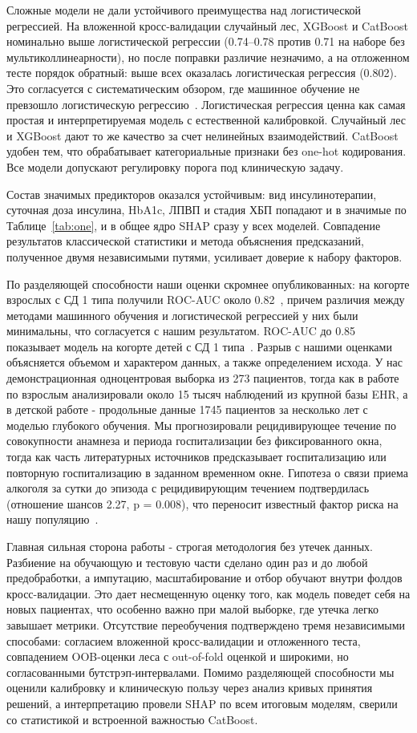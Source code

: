 \documentclass[12pt,a4paper]{article}
\begin{document}
Сложные модели не дали устойчивого преимущества над логистической регрессией. На вложенной
кросс-валидации случайный лес, XGBoost и CatBoost номинально выше логистической регрессии
(0.74--0.78 против 0.71 на наборе без мультиколлинеарности), но после поправки различие
незначимо, а на отложенном тесте порядок обратный: выше всех оказалась логистическая регрессия
(0.802). Это согласуется с систематическим обзором, где машинное обучение не превзошло
логистическую регрессию~\cite{ref17}. Логистическая регрессия ценна как
самая простая и интерпретируемая модель с естественной калибровкой. Случайный лес и XGBoost
дают то же качество за счет нелинейных взаимодействий. CatBoost удобен тем, что обрабатывает
категориальные признаки без one-hot кодирования. Все модели допускают регулировку порога под
клиническую задачу.

Состав значимых предикторов оказался устойчивым: вид инсулинотерапии, суточная доза инсулина,
HbA1c, ЛПВП и стадия ХБП попадают и в значимые по Таблице~\ref{tab:one}, и в общее ядро SHAP
сразу у всех моделей. Совпадение результатов классической статистики и метода объяснения
предсказаний, полученное двумя независимыми путями, усиливает доверие к набору факторов.

По разделяющей способности наши оценки скромнее опубликованных: на когорте взрослых с СД 1
типа получили ROC-AUC около 0.82~\cite{ref10}, причем различия между методами машинного
обучения и логистической регрессией у них были минимальны, что согласуется с нашим
результатом. ROC-AUC до 0.85 показывает модель на когорте детей с СД 1 типа~\cite{ref9}.
Разрыв с нашими оценками объясняется объемом и характером данных, а также определением исхода.
У нас демонстрационная одноцентровая выборка из 273 пациентов, тогда как в работе по взрослым
\cite{ref10} анализировали около 15 тысяч наблюдений из крупной базы EHR, а в детской работе
\cite{ref9} - продольные данные 1745 пациентов за несколько лет с моделью глубокого обучения.
Мы прогнозировали рецидивирующее течение по совокупности анамнеза и периода госпитализации без
фиксированного окна, тогда как часть литературных источников предсказывает госпитализацию или
повторную госпитализацию в заданном временном окне. Гипотеза о связи приема алкоголя за сутки
до эпизода с рецидивирующим течением подтвердилась (отношение шансов 2.27, p = 0.008), что
переносит известный фактор риска на нашу популяцию~\cite{ref7,ref15,ref16}.

Главная сильная сторона работы - строгая методология без утечек данных. Разбиение на обучающую
и тестовую части сделано один раз и до любой предобработки, а импутацию, масштабирование и
отбор обучают внутри фолдов кросс-валидации. Это дает несмещенную оценку того, как модель
поведет себя на новых пациентах, что особенно важно при малой выборке, где утечка легко
завышает метрики. Отсутствие переобучения подтверждено тремя независимыми способами: согласием
вложенной кросс-валидации и отложенного теста, совпадением OOB-оценки леса с out-of-fold
оценкой и широкими, но согласованными бутстрэп-интервалами. Помимо разделяющей способности мы
оценили калибровку и клиническую пользу через анализ кривых принятия решений, а интерпретацию
провели SHAP по всем итоговым моделям, сверили со статистикой и встроенной важностью CatBoost.
\end{document}
